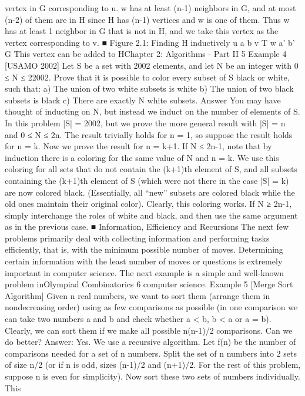 \documentclass[a4paper,11pt]{book}
\begin{document}
vertex in G corresponding to u. w has at least (n-1) neighbors in G,
and at most (n-2) of them are in H since H has (n-1) vertices and w
is one of them. Thus w has at least 1 neighbor in G that is not in H,
and we take this vertex as the vertex corresponding to v. ■
Figure 2.1: Finding H inductively
u
a b
v
T
w
a’ b’
G
This vertex can
be added to HChapter 2: Algorithms - Part II 5
Example 4 [USAMO 2002]
Let S be a set with 2002 elements, and let N be an integer with 0 ≤
N ≤ 22002. Prove that it is possible to color every subset of S black
or white, such that:
a) The union of two white subsets is white
b) The union of two black subsets is black
c) There are exactly N white subsets.
Answer
You may have thought of inducting on N, but instead we induct on
the number of elements of S. In this problem |S| = 2002, but we
prove the more general result with |S| = n and 0 ≤ N ≤ 2n. The
result trivially holds for n = 1, so suppose the result holds for n =
k. Now we prove the result for n = k+1. If N ≤ 2n-1, note that by
induction there is a coloring for the same value of N and n = k. We
use this coloring for all sets that do not contain the (k+1)th
element of S, and all subsets containing the (k+1)th element of S
(which were not there in the case |S| = k) are now colored black.
(Essentially, all “new” subsets are colored black while the old ones
maintain their original color). Clearly, this coloring works.
If N ≥ 2n-1, simply interchange the roles of white and black, and
then use the same argument as in the previous case. ■
Information, Efficiency and Recursions
The next few problems primarily deal with collecting information
and performing tasks efficiently, that is, with the minimum
possible number of moves. Determining certain information with
the least number of moves or questions is extremely important in
computer science.
The next example is a simple and well-known problem inOlympiad Combinatorics 6
computer science.
Example 5 [Merge Sort Algorithm]
Given n real numbers, we want to sort them (arrange them in nondecreasing order) using as few comparisons as possible (in one
comparison we can take two numbers a and b and check whether
a < b, b < a or a = b). Clearly, we can sort them if we make all
possible n(n-1)/2 comparisons. Can we do better?
Answer:
Yes. We use a recursive algorithm. Let f(n) be the number of
comparisons needed for a set of n numbers. Split the set of n
numbers into 2 sets of size n/2 (or if n is odd, sizes (n-1)/2 and
(n+1)/2. For the rest of this problem, suppose n is even for
simplicity). Now sort these two sets of numbers individually. This
\end{document}
